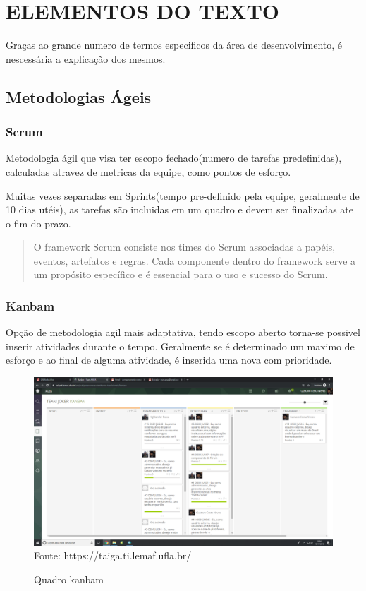 \chapter{ELEMENTOS DO TEXTO}
\label{cap:elementos}

Graças ao grande numero de termos especificos da área de desenvolvimento, é nescessária a explicação dos mesmos.

\section{Metodologias Ágeis}

\subsection{Scrum}

Metodologia ágil que visa ter escopo fechado(numero de tarefas predefinidas), calculadas atravez de metricas da equipe, como pontos de esforço.

Muitas vezes separadas em Sprints(tempo pre-definido pela equipe, geralmente de 10 dias utéis), as tarefas são incluidas em um quadro e devem ser finalizadas ate o fim do prazo.

\begin{quote}
  O framework Scrum consiste nos times do Scrum associadas a papéis, eventos, artefatos e
  regras. Cada componente dentro do framework serve a um propósito específico e é essencial
  para o uso e sucesso do Scrum.
\end{quote}

\subsection{Kanbam}
  Opção de metodologia agil mais adaptativa, tendo escopo aberto torna-se possivel inserir atividades durante o tempo.
  Geralmente se é determinado um maximo de esforço e ao final de alguma atividade, é inserida uma nova com prioridade.
\begin{figure}[!htb]
\centering
\caption{Quadro kanbam} %
\includegraphics[scale=0.2]{quadroKanbam}\\  %
{\small Fonte: https://taiga.ti.lemaf.ufla.br/} %
\label{fig:exemplo} %
\end{figure}

